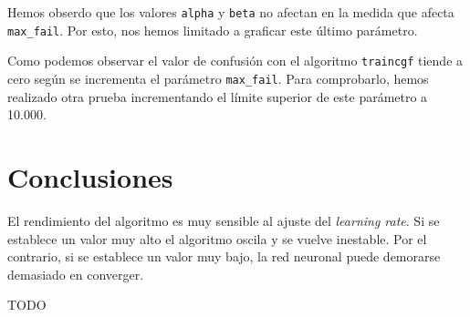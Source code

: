 \documentclass[a4paper,12pt,titlepage]{article}
\begin{document}
Hemos obserdo que los valores \lstinline|alpha| y \lstinline|beta| no afectan en la medida que afecta \lstinline|max_fail|. Por esto, nos hemos limitado a graficar este último parámetro.


Como podemos observar el valor de confusión con el algoritmo \lstinline|traincgf| tiende a cero según se incrementa el parámetro \lstinline|max_fail|. Para comprobarlo, hemos realizado otra prueba incrementando el límite superior de este parámetro a 10.000.

\section{Conclusiones}

El rendimiento del algoritmo es muy sensible al ajuste del \textit{learning rate}. Si se establece un valor muy alto el algoritmo oscila y se vuelve inestable. Por el contrario, si se establece un valor muy bajo, la red neuronal puede demorarse demasiado en converger. 

TODO



\end{document}
